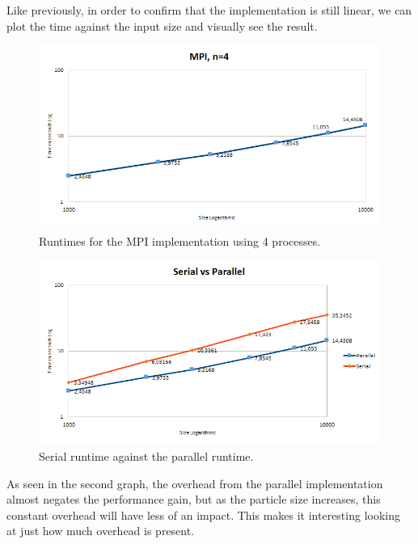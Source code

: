 Like previously, in order to confirm that the implementation is still linear, we can plot the time against the input size
and visually see the result.

\begin{figure}[H]
  \centering
  \begin{minipage}[b]{0.9\textwidth}
    \includegraphics[width=\textwidth]{mpi_log.png}
    \caption{Runtimes for the MPI implementation using 4 processes.}
  \end{minipage}
\end{figure}

\begin{figure}[H]
  \centering
  \begin{minipage}[b]{0.9\textwidth}
    \includegraphics[width=\textwidth]{serialvsparallel.png}
    \caption{Serial runtime against the parallel runtime.}
  \end{minipage}
\end{figure}

As seen in the second graph, the overhead from the parallel implementation almost negates the performance gain, but as the particle size increases, this constant overhead will have less of an impact. This makes it interesting looking at just how much overhead is present.

